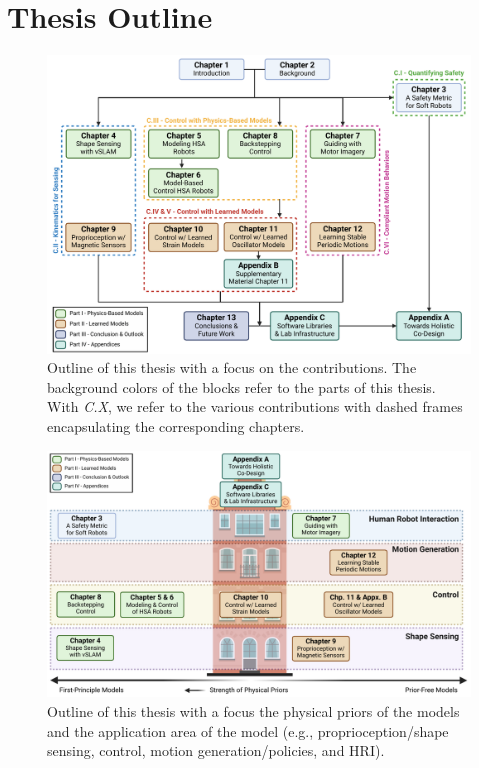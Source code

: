 \section{Thesis Outline}\label{sec:introduction:outline}

\begin{figure}[ht]
    \centering
    \includegraphics[width=1.0\linewidth]{introduction/figures/thesis_outline_tree_v2.pdf}
    \caption{Outline of this thesis with a focus on the contributions. The background colors of the blocks refer to the parts of this thesis. With \emph{C.X}, we refer to the various contributions with dashed frames encapsulating the corresponding chapters.}
    \label{fig:introduction:thesis_outline_tree}
\end{figure}

\begin{figure}[ht]
    \centering
    \includegraphics[width=1.0\linewidth]{introduction/figures/thesis_outline_house_v2.pdf}
    \caption{Outline of this thesis with a focus the physical priors of the models and the application area of the model (e.g., proprioception/shape sensing, control, motion generation/policies, and \gls{HRI}).}
    \label{fig:introduction:thesis_outline_house}
\end{figure}

